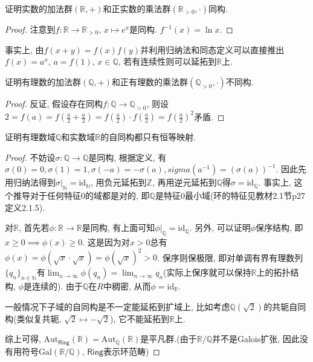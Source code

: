 \begin{problem}
    证明实数的加法群$(\mathbb{R}, +)$和正实数的乘法群$(\mathbb{R}_{>0}, \cdot)$同构.
\end{problem}

\begin{proof}
    注意到$f: \mathbb{R} \to \mathbb{R}_{>0},\, x \mapsto e^x$是同构. $f^{-1}(x) = \ln x$.
\end{proof}

\begin{remark}
    事实上, 由$f(x + y) = f(x)f(y)$并利用归纳法和同态定义可以直接推出$f(x) = a^x,\, a = f(1),\, x \in \mathbb{Q}$, 若有连续性则可以延拓到$\mathbb{R}$上.
\end{remark}

\begin{problem}
    证明有理数的加法群$(\mathbb{Q}, +)$和正有理数的乘法群$(\mathbb{Q}_{>0}, \cdot)$不同构.
\end{problem}

\begin{proof}
    反证, 假设存在同构$f: \mathbb{Q} \to \mathbb{Q}_{>0}$, 则设$2 = f(a) = f(\frac{a}{2} + \frac{a}{2}) = f(\frac{a}{2}) \cdot f(\frac{a}{2}) = f(\frac{a}{2})^2$矛盾.
\end{proof}

\begin{problem}\label{ex:1.4.7}
    证明有理数域$\mathbb{Q}$和实数域$\mathbb{R}$的自同构都只有恒等映射.
\end{problem}

\begin{proof}
    不妨设$\sigma: \mathbb{Q} \to \mathbb{Q}$是同构, 根据定义, 有$\sigma(0) = 0, \sigma(1) = 1, \sigma(-a) = -\sigma(a), sigma(a^{-1}) = (\sigma(a))^{-1}$. 因此先用归纳法得到$\sigma|_{\mathbb{N}} = \mathrm{id}_{\mathbb{N}}$, 用负元延拓到$\mathbb{Z}$, 再用逆元延拓到$\mathbb{Q}$得$\sigma = \mathrm{id}_{\mathbb{Q}}$. 事实上, 这个推导对于任何特征$0$的域都是对的, 即$\mathbb{Q}$是特征$0$最小域(环的特征见教材2.1节p27定义2.1.5).

    对$\mathbb{R}$, 首先若$\phi: \mathbb{R} \to \mathbb{R}$是同构, 有上面可知$\phi|_{\mathbb{Q}} = \mathrm{id}_{\mathbb{Q}}$. 另外, 可以证明$\phi$保序结构, 即$x \geqslant 0 \implies \phi(x) \geqslant 0$. 这是因为对$x > 0$总有$\phi(x) = \phi(\sqrt{x} \cdot \sqrt{x}) = \phi(\sqrt{x})^2 > 0$. 保序则保极限, 即对单调有界有理数列$\{q_n\}_{n \in \mathbb{N}}$有$\lim_{n \to \infty} \phi(q_n) = \lim_{n \to \infty} q_n$(实际上保序就可以保持$\mathbb{R}$上的拓扑结构, $\phi$是连续的). 由于$\mathbb{Q}$在$R$中稠密, 从而$\phi = \mathrm{id}_{\mathbb{R}}$.

    一般情况下子域的自同构是不一定能延拓到扩域上, 比如考虑$\mathbb{Q}(\sqrt{2})$的共轭自同构(类似复共轭, $\sqrt{2} \mapsto -\sqrt{2}$), 它不能延拓到$\mathbb{R}$上.

    综上可得, $\mathrm{Aut}_{\mathsf{Ring}}(\mathbb{R}) = \mathrm{Aut}_{\mathbb{Q}}(\mathbb{R})$是平凡群.(由于$\mathbb{R}/\mathbb{Q}$并不是Galois扩张, 因此没有用符号$\mathrm{Gal}(\mathbb{R}/\mathbb{Q})$, $\mathsf{Ring}$表示环范畴)
\end{proof}

